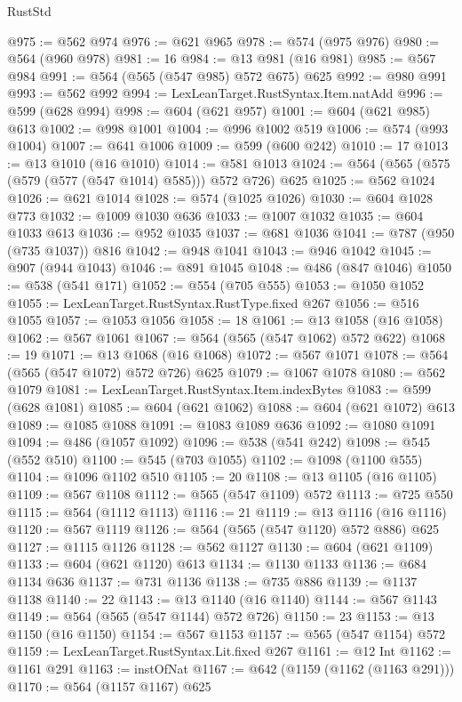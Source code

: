 \begin{lexlean}{RustStd}
\begin{coremodule}
@975 := @562 @974
@976 := @621 @965
@978 := @574 (@975 @976)
@980 := @564 (@960 @978)
@981 := 16
@984 := @13 @981 (@16 @981)
@985 := @567 @984
@991 := @564 (@565 (@547 @985) @572 @675) @625
@992 := @980 @991
@993 := @562 @992
@994 := LexLeanTarget.RustSyntax.Item.natAdd
@996 := @599 (@628 @994)
@998 := @604 (@621 @957)
@1001 := @604 (@621 @985) @613
@1002 := @998 @1001
@1004 := @996 @1002 @519
@1006 := @574 (@993 @1004)
@1007 := @641 @1006
@1009 := @599 (@600 @242)
@1010 := 17
@1013 := @13 @1010 (@16 @1010)
@1014 := @581 @1013
@1024 := @564 (@565 (@575 (@579 (@577 (@547 @1014) @585))) @572 @726) @625
@1025 := @562 @1024
@1026 := @621 @1014
@1028 := @574 (@1025 @1026)
@1030 := @604 @1028 @773
@1032 := @1009 @1030 @636
@1033 := @1007 @1032
@1035 := @604 @1033 @613
@1036 := @952 @1035
@1037 := @681 @1036
@1041 := @787 (@950 (@735 @1037)) @816
@1042 := @948 @1041
@1043 := @946 @1042
@1045 := @907 (@944 @1043)
@1046 := @891 @1045
@1048 := @486 (@847 @1046)
@1050 := @538 (@541 @171)
@1052 := @554 (@705 @555)
@1053 := @1050 @1052
@1055 := LexLeanTarget.RustSyntax.RustType.fixed @267
@1056 := @516 @1055
@1057 := @1053 @1056
@1058 := 18
@1061 := @13 @1058 (@16 @1058)
@1062 := @567 @1061
@1067 := @564 (@565 (@547 @1062) @572 @622)
@1068 := 19
@1071 := @13 @1068 (@16 @1068)
@1072 := @567 @1071
@1078 := @564 (@565 (@547 @1072) @572 @726) @625
@1079 := @1067 @1078
@1080 := @562 @1079
@1081 := LexLeanTarget.RustSyntax.Item.indexBytes
@1083 := @599 (@628 @1081)
@1085 := @604 (@621 @1062)
@1088 := @604 (@621 @1072) @613
@1089 := @1085 @1088
@1091 := @1083 @1089 @636
@1092 := @1080 @1091
@1094 := @486 (@1057 @1092)
@1096 := @538 (@541 @242)
@1098 := @545 (@552 @510)
@1100 := @545 (@703 @1055)
@1102 := @1098 (@1100 @555)
@1104 := @1096 @1102 @510
@1105 := 20
@1108 := @13 @1105 (@16 @1105)
@1109 := @567 @1108
@1112 := @565 (@547 @1109) @572
@1113 := @725 @550
@1115 := @564 (@1112 @1113)
@1116 := 21
@1119 := @13 @1116 (@16 @1116)
@1120 := @567 @1119
@1126 := @564 (@565 (@547 @1120) @572 @886) @625
@1127 := @1115 @1126
@1128 := @562 @1127
@1130 := @604 (@621 @1109)
@1133 := @604 (@621 @1120) @613
@1134 := @1130 @1133
@1136 := @684 @1134 @636
@1137 := @731 @1136
@1138 := @735 @886
@1139 := @1137 @1138
@1140 := 22
@1143 := @13 @1140 (@16 @1140)
@1144 := @567 @1143
@1149 := @564 (@565 (@547 @1144) @572 @726)
@1150 := 23
@1153 := @13 @1150 (@16 @1150)
@1154 := @567 @1153
@1157 := @565 (@547 @1154) @572
@1159 := LexLeanTarget.RustSyntax.Lit.fixed @267
@1161 := @12 Int
@1162 := @1161 @291
@1163 := instOfNat
@1167 := @642 (@1159 (@1162 (@1163 @291)))
@1170 := @564 (@1157 @1167) @625

\end{coremodule}
\end{lexlean}
